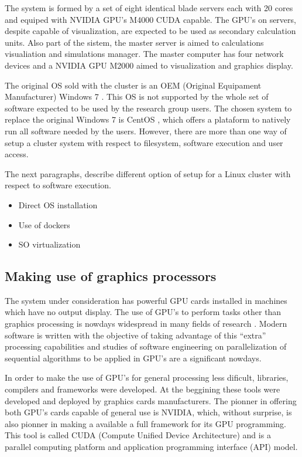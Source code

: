 \documentclass[twoside,a4paper,12pt,english]{inac17}
\begin{document}
The system is formed by a set of eight identical blade servers each with 20 cores and equiped with
NVIDIA GPU's M4000 CUDA\cite{CUDA} capable. The GPU's on servers, despite capable of visualization,
are expected to be used as secondary calculation units. Also part of the sistem, the master server is aimed to calculations
visualiation and simulations manager. The master computer has
four network devices and a NVIDIA GPU M2000 aimed to visualization and graphics display.

The original OS sold with the cluster is an OEM (Original Equipament Manufacturer) Windows 7 \cite{windows7}. This
OS is not supported by the whole set of software expected to be used by the research group users. The chosen
system to replace the original Windows 7 is CentOS \cite{centos}, which offers a plataform to natively run all
software needed by the users. However, there are more than one way of setup a cluster system with respect
to filesystem, software execution and user access.

The next paragraphs, describe different option of setup for a Linux cluster with respect to software execution.

\begin{itemize}
\item Direct OS installation
\item Use of dockers
\item SO virtualization
\end{itemize}

\subsection{Making use of graphics processors}

The system under consideration has powerful GPU cards installed in machines
which have no output display. The use of GPU's to perform tasks other than graphics processing
is nowdays widespread in many fields of research \cite{UsoDeGpus}. Modern software is written with
the objective of taking advantage of this ``extra'' processing capabilities and studies of software
engineering on parallelization of sequential algorithms to be applied in GPU's are a significant
nowdays.

In order to make the use of GPU's for general processing less dificult, libraries, compilers and
frameworks were developed. At the beggining these tools were developed and deployed by graphics cards
manufacturers. The pionner in offering both GPU's cards capable of general use is NVIDIA, which,
without surprise, is also pionner in making a available a full framework for its GPU programming.
This tool is called CUDA (Compute Unified Device Architecture) and is a parallel computing platform
and application programming interface (API) model.
\end{document}
